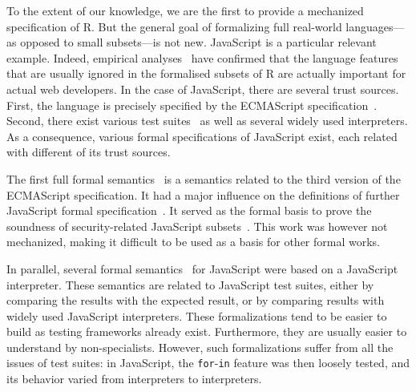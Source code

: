 \documentclass[
    sigplan,
    10pt,
    review, %
    natbib=false %
 ]{acmart}
\begin{document}
To the extent of our knowledge,
we are the first to provide a mechanized specification of R.
But the general goal of formalizing full real-world languages---%
as opposed to small subsets---is not new.
%
JavaScript is a particular relevant example.
Indeed, empirical analyses~\parencite{RichardsHBV11}
have confirmed that the language features
that are usually ignored in the formalised subsets of R
are actually important for actual web developers.
%
In the case of JavaScript, there are several trust sources.
First, the language is precisely specified by the ECMAScript specification~\parencite{es2019}.
Second, there exist various test suites~\parencite{test262, mozillatests}
as well as several widely used interpreters.
As a consequence, various formal specifications of JavaScript exist,
each related with different of its trust sources.

The first full formal semantics~\parencite{aplas08}
is a semantics related to the third version of the ECMAScript specification.
It had a major influence on the definitions of further JavaScript formal
specification~\parencite{ses, popl14jscert, popl12-Towards, usenix}.
It served as the formal basis to prove the soundness of security-related
JavaScript subsets~\parencite{MMT-CSF-TR09, mmt-esorics09, mmt-oakland10}.
This work was however not mechanized, making it difficult to be used
as a basis for other formal works.

In parallel, several formal semantics~\parencite{js-ml, Guha2010, Politz:S5, kjs}
for JavaScript were based on a JavaScript interpreter.
These semantics are related to JavaScript test suites,
either by comparing the results with the expected result,
or by comparing results with widely used JavaScript interpreters.
These formalizations tend to be easier to build
as testing frameworks already exist.
Furthermore, they are usually easier to understand by non-specialists.
However, such formalizations suffer from all the issues of test suites:
in JavaScript, the \texttt{for}-\texttt{in}
feature was then loosely tested,
and its behavior varied from interpreters to interpreters.
\end{document}

